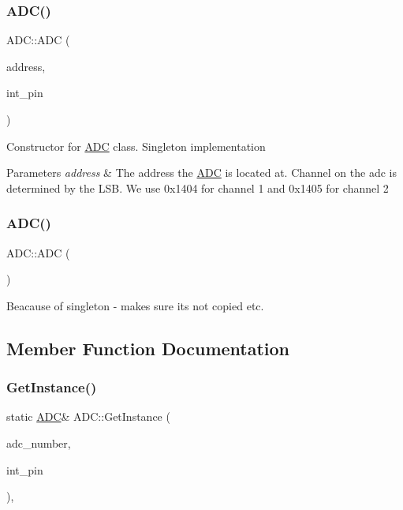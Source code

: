 \subsubsection{\texorpdfstring{A\+D\+C()}{ADC()}\hspace{0.1cm}{\footnotesize\ttfamily [1/2]}}
{\footnotesize\ttfamily A\+D\+C\+::\+A\+DC (\begin{DoxyParamCaption}\item[{uint16\+\_\+t}]{address,  }\item[{uint8\+\_\+t}]{int\+\_\+pin }\end{DoxyParamCaption})\hspace{0.3cm}{\ttfamily [private]}}

Constructor for \hyperlink{class_a_d_c}{A\+DC} class. Singleton implementation 
\begin{DoxyParams}{Parameters}
{\em address} & The address the \hyperlink{class_a_d_c}{A\+DC} is located at. Channel on the adc is determined by the L\+SB. We use 0x1404 for channel 1 and 0x1405 for channel 2 \\
\hline
\end{DoxyParams}
\hypertarget{class_a_d_c_a50cb1d4e5bb8e3812732d9efdde4af67}{}\label{class_a_d_c_a50cb1d4e5bb8e3812732d9efdde4af67} 
\subsubsection{\texorpdfstring{A\+D\+C()}{ADC()}\hspace{0.1cm}{\footnotesize\ttfamily [2/2]}}
{\footnotesize\ttfamily A\+D\+C\+::\+A\+DC (\begin{DoxyParamCaption}\item[{const \hyperlink{class_a_d_c}{A\+DC} \&}]{ }\end{DoxyParamCaption})\hspace{0.3cm}{\ttfamily [delete]}}

Beacause of singleton -\/ makes sure its not copied etc. 

\subsection{Member Function Documentation}
\hypertarget{class_a_d_c_aa9294ebc0b114898aa33d9e09537bdb5}{}\label{class_a_d_c_aa9294ebc0b114898aa33d9e09537bdb5} 
\subsubsection{\texorpdfstring{Get\+Instance()}{GetInstance()}}
{\footnotesize\ttfamily static \hyperlink{class_a_d_c}{A\+DC}\& A\+D\+C\+::\+Get\+Instance (\begin{DoxyParamCaption}\item[{uint16\+\_\+t}]{adc\+\_\+number,  }\item[{uint8\+\_\+t}]{int\+\_\+pin }\end{DoxyParamCaption})\hspace{0.3cm}{\ttfamily [inline]}, {\ttfamily [static]}}

